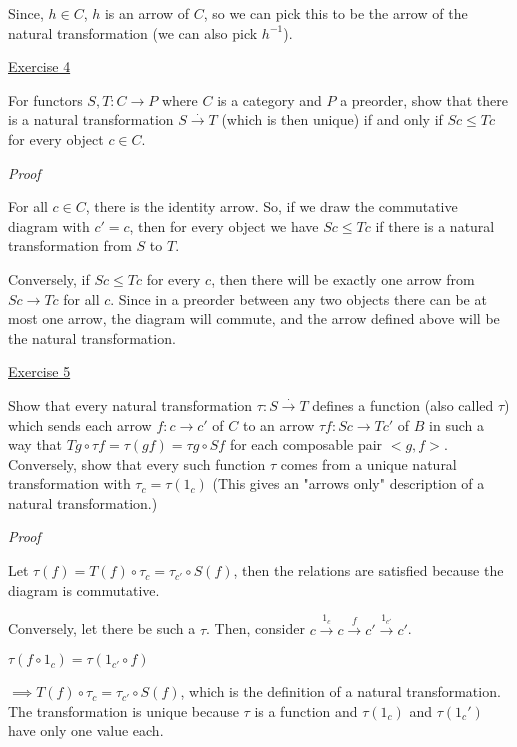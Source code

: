 \documentclass[11pt]{article}
\begin{document}
Since, $h \in C$, $h$ is an arrow of $C$, so we can pick this to be the arrow of the natural transformation (we can also pick $h^{-1}$).



\vspace{2mm}
\noindent
\underline{Exercise 4}
\vspace{2mm}

For functors $S, T: C \to P$ where $C$ is a category and $P$ a preorder, show that
there is a natural transformation $S \xrightarrow{.} T$ (which is then unique) if and only if
$Sc \leq Tc$ for every object $c \in C$.

\vspace{2mm}
\noindent
\emph{Proof}

For all $c \in C$, there is the identity arrow. So, if we draw the commutative diagram with $c' = c$, then for every object we have $Sc \leq Tc$ if there is a natural transformation from $S$ to $T$.

Conversely, if $Sc \leq Tc$ for every $c$, then there will be exactly one arrow from $Sc \to Tc$ for all $c$. Since in a preorder between any two objects there can be at most one arrow, the diagram will commute, and the arrow defined above will be the natural transformation.


\vspace{2mm}
\noindent
\underline{Exercise 5}
\vspace{2mm}

Show that every natural transformation $\tau : S \xrightarrow{.} T$ defines a function (also called $\tau$)
which sends each arrow $f: c \to c'$ of $C$ to an arrow $\tau f: Sc \to Tc'$ of $B$ in such a
way that $Tg \circ \tau f = \tau(gf) = \tau g \circ Sf$ for each composable pair $<g, f>$. Conversely,
show that every such function $\tau$ comes from a unique natural transformation
with $\tau_c = \tau(1_c)$ (This gives an "arrows only" description of a natural transformation.)

\vspace{2mm}
\noindent
\emph{Proof}

Let $\tau(f) = T(f) \circ \tau_c = \tau_{c'} \circ S(f)$, then the relations are satisfied because the diagram is commutative. 

Conversely, let there be such a $\tau$. Then, consider $c \xrightarrow{1_c} c \xrightarrow{f} c' \xrightarrow{1_{c'}} c'$. 

$\tau(f \circ 1_c) = \tau(1_{c'} \circ f)$

$\implies T(f) \circ \tau_c = \tau_{c'} \circ S(f)$, which is the definition of a natural transformation. The transformation is unique because $\tau$ is a function and $\tau(1_c)$ and $\tau(1_c')$ have only one value each.
\end{document}
